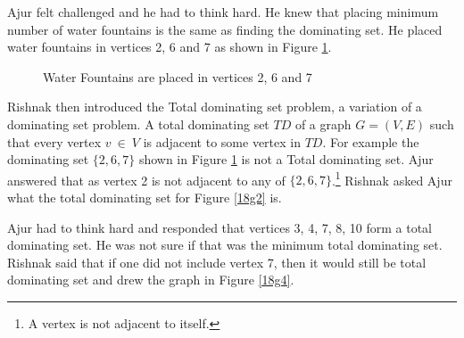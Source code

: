 Ajur felt challenged and he had to think hard. He knew that placing minimum number of water fountains is the same as finding the dominating set. He placed water fountains in vertices 2, 6 and 7 as shown in Figure \ref{18g3}.

\begin{figure}
\begin{center}

\caption{Water Fountains are placed in vertices 2, 6 and 7 }\label{18g3}
\end{center}
\end{figure}

Rishnak then introduced the Total dominating set problem, a variation of a dominating set problem. A total dominating set $TD$ of a graph $G=(V,E)$ such that every vertex $v~\in~V$ is adjacent to some vertex in $TD$. For example the dominating set $\{2,6,7\}$ shown in Figure \ref{18g3} is not a Total dominating set. Ajur answered that as vertex 2 is not adjacent to any of $\{2,6,7\}$.\footnote{A vertex is not adjacent to itself.} Rishnak asked Ajur what the total dominating set for Figure \ref{18g2} is.

Ajur had to think hard and responded that vertices 3, 4, 7, 8, 10 form a total dominating set. He was not sure if that was the minimum total dominating set. Rishnak said that if one did not include vertex 7, then it would still be total dominating set and drew the graph in Figure \ref{18g4}.

